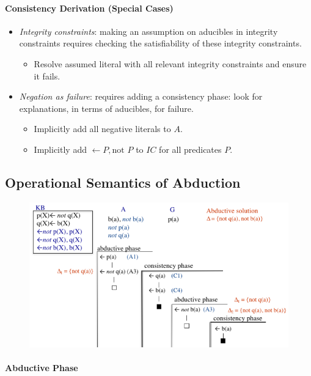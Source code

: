\documentclass[twocolumn,english]{article}
\begin{document}
\paragraph{Consistency Derivation (Special Cases)}
\begin{itemize}
\item \emph{Integrity constraints}: making an assumption on aducibles in
integrity constraints requires checking the satisfiability of these
integrity constraints.
\begin{itemize}
\item Resolve assumed literal with all relevant integrity constraints and
ensure it fails.
\end{itemize}
\item \emph{Negation as failure}: requires adding a consistency phase: look
for explanations, in terms of aducibles, for failure.
\begin{itemize}
\item Implicitly add all negative literals to $A$.
\item Implicitly add $\leftarrow P,\text{not }P$ to $IC$ for all predicates
$P$.
\end{itemize}
\end{itemize}

\subsection{Operational Semantics of Abduction}

\begin{figure}[H]
\centering{}\includegraphics[width=0.75\columnwidth]{img/abduction-example}
\end{figure}

\paragraph{Abductive Phase}
\end{document}
